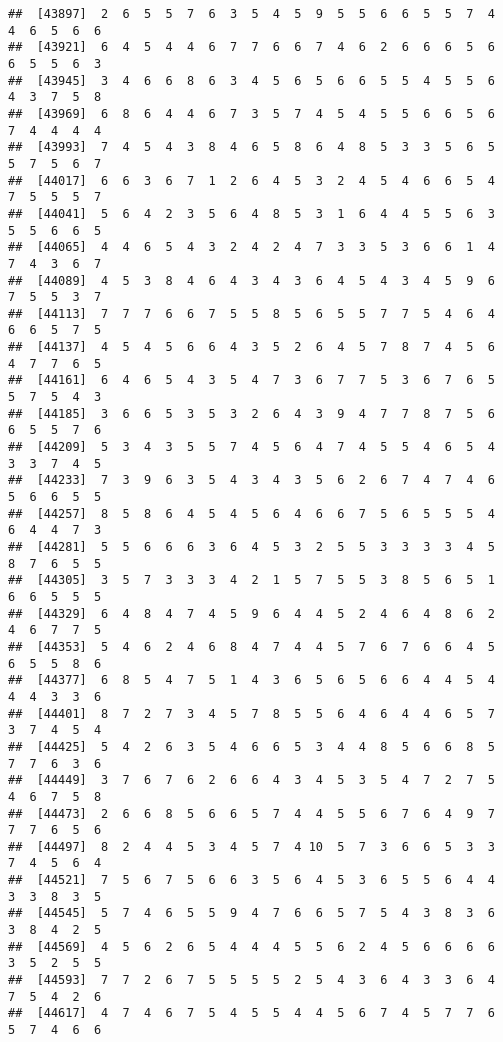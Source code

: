 \documentclass[
]{book}
\begin{document}
\begin{verbatim}
##  [43897]  2  6  5  5  7  6  3  5  4  5  9  5  5  6  6  5  5  7  4  4  6  5  6  6
##  [43921]  6  4  5  4  4  6  7  7  6  6  7  4  6  2  6  6  6  5  6  6  5  5  6  3
##  [43945]  3  4  6  6  8  6  3  4  5  6  5  6  6  5  5  4  5  5  6  4  3  7  5  8
##  [43969]  6  8  6  4  4  6  7  3  5  7  4  5  4  5  5  6  6  5  6  7  4  4  4  4
##  [43993]  7  4  5  4  3  8  4  6  5  8  6  4  8  5  3  3  5  6  5  5  7  5  6  7
##  [44017]  6  6  3  6  7  1  2  6  4  5  3  2  4  5  4  6  6  5  4  7  5  5  5  7
##  [44041]  5  6  4  2  3  5  6  4  8  5  3  1  6  4  4  5  5  6  3  5  5  6  6  5
##  [44065]  4  4  6  5  4  3  2  4  2  4  7  3  3  5  3  6  6  1  4  7  4  3  6  7
##  [44089]  4  5  3  8  4  6  4  3  4  3  6  4  5  4  3  4  5  9  6  7  5  5  3  7
##  [44113]  7  7  7  6  6  7  5  5  8  5  6  5  5  7  7  5  4  6  4  6  6  5  7  5
##  [44137]  4  5  4  5  6  6  4  3  5  2  6  4  5  7  8  7  4  5  6  4  7  7  6  5
##  [44161]  6  4  6  5  4  3  5  4  7  3  6  7  7  5  3  6  7  6  5  5  7  5  4  3
##  [44185]  3  6  6  5  3  5  3  2  6  4  3  9  4  7  7  8  7  5  6  6  5  5  7  6
##  [44209]  5  3  4  3  5  5  7  4  5  6  4  7  4  5  5  4  6  5  4  3  3  7  4  5
##  [44233]  7  3  9  6  3  5  4  3  4  3  5  6  2  6  7  4  7  4  6  5  6  6  5  5
##  [44257]  8  5  8  6  4  5  4  5  6  4  6  6  7  5  6  5  5  5  4  6  4  4  7  3
##  [44281]  5  5  6  6  6  3  6  4  5  3  2  5  5  3  3  3  3  4  5  8  7  6  5  5
##  [44305]  3  5  7  3  3  3  4  2  1  5  7  5  5  3  8  5  6  5  1  6  6  5  5  5
##  [44329]  6  4  8  4  7  4  5  9  6  4  4  5  2  4  6  4  8  6  2  4  6  7  7  5
##  [44353]  5  4  6  2  4  6  8  4  7  4  4  5  7  6  7  6  6  4  5  6  5  5  8  6
##  [44377]  6  8  5  4  7  5  1  4  3  6  5  6  5  6  6  4  4  5  4  4  4  3  3  6
##  [44401]  8  7  2  7  3  4  5  7  8  5  5  6  4  6  4  4  6  5  7  3  7  4  5  4
##  [44425]  5  4  2  6  3  5  4  6  6  5  3  4  4  8  5  6  6  8  5  7  7  6  3  6
##  [44449]  3  7  6  7  6  2  6  6  4  3  4  5  3  5  4  7  2  7  5  4  6  7  5  8
##  [44473]  2  6  6  8  5  6  6  5  7  4  4  5  5  6  7  6  4  9  7  7  7  6  5  6
##  [44497]  8  2  4  4  5  3  4  5  7  4 10  5  7  3  6  6  5  3  3  7  4  5  6  4
##  [44521]  7  5  6  7  5  6  6  3  5  6  4  5  3  6  5  5  6  4  4  3  3  8  3  5
##  [44545]  5  7  4  6  5  5  9  4  7  6  6  5  7  5  4  3  8  3  6  3  8  4  2  5
##  [44569]  4  5  6  2  6  5  4  4  4  5  5  6  2  4  5  6  6  6  6  3  5  2  5  5
##  [44593]  7  7  2  6  7  5  5  5  5  2  5  4  3  6  4  3  3  6  4  7  5  4  2  6
##  [44617]  4  7  4  6  7  5  4  5  5  4  4  5  6  7  4  5  7  7  6  5  7  4  6  6

\end{verbatim}
\end{document}
